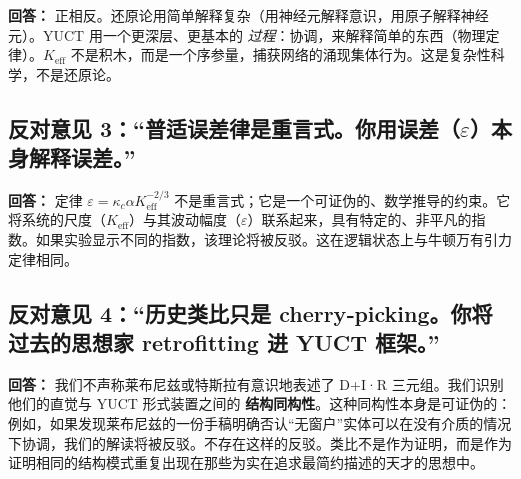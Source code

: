 \documentclass[12pt,a4paper]{article}
\newcommand{\Keff}{K_{\mathrm{eff}}}
\begin{document}
	\textbf{回答：} 正相反。还原论用简单解释复杂（用神经元解释意识，用原子解释神经元）。YUCT 用一个更深层、更基本的 \emph{过程}：协调，来解释简单的东西（物理定律）。\(\Keff\) 不是积木，而是一个序参量，捕获网络的涌现集体行为。这是复杂性科学，不是还原论。
	
	\subsection*{反对意见 3：“普适误差律是重言式。你用误差（\(\varepsilon\)）本身解释误差。”}
	
	\textbf{回答：} 定律 \(\varepsilon = \kappa_c \alpha \Keff^{-2/3}\) 不是重言式；它是一个可证伪的、数学推导的约束。它将系统的尺度（\(\Keff\)）与其波动幅度（\(\varepsilon\)）联系起来，具有特定的、非平凡的指数。如果实验显示不同的指数，该理论将被反驳。这在逻辑状态上与牛顿万有引力定律相同。
	
	\subsection*{反对意见 4：“历史类比只是 cherry‑picking。你将过去的思想家 retrofitting 进 YUCT 框架。”}
	
	\textbf{回答：} 我们不声称莱布尼兹或特斯拉有意识地表述了 D+I·R 三元组。我们识别他们的直觉与 YUCT 形式装置之间的 \textbf{结构同构性}。这种同构性本身是可证伪的：例如，如果发现莱布尼兹的一份手稿明确否认“无窗户”实体可以在没有介质的情况下协调，我们的解读将被反驳。不存在这样的反驳。类比不是作为证明，而是作为证明相同的结构模式重复出现在那些为实在追求最简约描述的天才的思想中。
	
\end{document}
